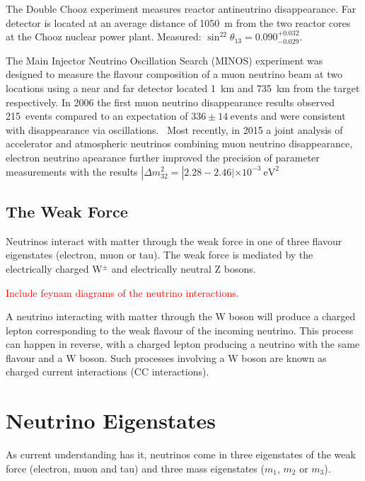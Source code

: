 The Double Chooz experiment measures reactor antineutrino
disappearance. 
Far detector is located at an average distance of 1050~m from the two
reactor cores at the Chooz nuclear power plant. 
Measured: 
$\sin^22\theta_{13} = 0.090^{+0.032}_{-0.029}$.~\cite{Abe:2014bwa}   

The Main Injector Neutrino Oscillation Search (MINOS) experiment was
designed to measure the flavour composition of a muon neutrino beam at 
two locations using a near and far detector located 1~km and 735~km
from the target respectively. 
In 2006 the first muon neutrino
disappearance results observed 215~events compared to an expectation
of $336 \pm 14~\text{events}$ and were consistent with disappearance
via oscillations.~\cite{MINOS:PhysRevLett.97.191801}
Most recently, in 2015 a joint analysis of accelerator and atmospheric
neutrinos combining muon neutrino
disappearance, electron neutrino apearance further improved the
precision of parameter measurements with the results 
$|\Delta m^2_{32} = |2.28-2.46| \times 10^{-3}~\text{eV}^2$
~\cite{MINOS:PhysRevLett.112.191801} 




\subsection{The Weak Force}

Neutrinos interact with matter through the weak force in one of three flavour eigenstates (electron, muon or tau). The weak force is mediated by the electrically charged W$^{\pm}$ and electrically neutral Z bosons.

\textcolor{red}{Include feynam diagrams of the neutrino interactions.}

A neutrino interacting with matter through the W boson will produce a charged lepton corresponding to the weak flavour of the incoming neutrino. 
This process can happen in reverse, with a charged lepton producing a neutrino with the same flavour and a W boson. Such processes involving a W boson are known as charged current interactions (CC interactions).


\section{Neutrino Eigenstates}

As current understanding has it, neutrinos come in three eigenstates
of the weak force (electron, muon and tau) and three mass eigenstates
($m_1$, $m_2$ or $m_3$).  

